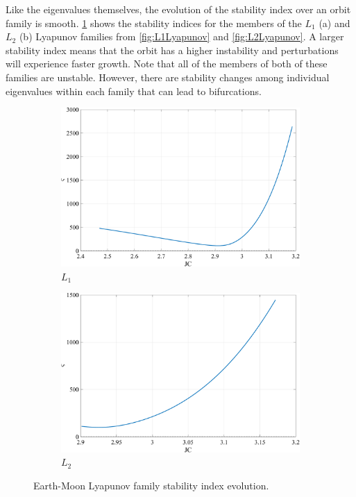 Like the eigenvalues themselves, the evolution of the stability index over an orbit family is
smooth. \cref{fig:stability} shows the stability indices for the members of the $L_{1}$ (a) and
$L_{2}$ (b) Lyapunov families from \cref{fig:L1Lyapunov} and \cref{fig:L2Lyapunov}. A larger
stability index means that the orbit has a higher instability and perturbations will experience
faster growth. Note that all of the members of both of these families are unstable. However, there
are stability changes among individual eigenvalues within each family that can lead to
bifurcations.

\begin{figure}[H]
    \begin{subfigure}[h]{0.4\linewidth}
        \includegraphics[width=\textwidth]{figures/L1LyapunovStability.pdf}
        \caption{$L_{1}$}
    \end{subfigure}
    \hfill
    \begin{subfigure}[h]{0.4\linewidth}
        \includegraphics[width=\textwidth]{figures/L2LyapunovStability.pdf}
        \caption{$L_{2}$}
    \end{subfigure}
    \caption{Earth-Moon Lyapunov family stability index evolution.}
    \label{fig:stability}
\end{figure}

